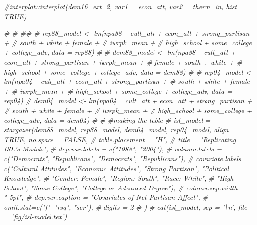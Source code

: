 \documentclass[
]{article}
\newenvironment{Shaded}{\begin{snugshade}}{\end{snugshade}}
\newcommand{\CommentTok}[1]{\textcolor[rgb]{0.56,0.35,0.01}{\textit{#1}}}
\begin{document}
\begin{Shaded}
\begin{Highlighting}[]
\CommentTok{#interplot::interplot(dem16_ext_2, var1 = econ_att, var2 = therm_in, hist = TRUE)}

\CommentTok{# }
\CommentTok{# ##}
\CommentTok{# rep88_model <- lm(npa88 ~ cult_att + econ_att + strong_partisan +}
\CommentTok{#                                       south + white + female +}
\CommentTok{#                                       iwrpk_mean +}
\CommentTok{#                                       high_school + some_college + college_adv, data = rep88)}
\CommentTok{# }
\CommentTok{# dem88_model <- lm(npa88 ~ cult_att + econ_att + strong_partisan + iwrpk_mean +}
\CommentTok{#                                       female + south + white +}
\CommentTok{#                                       high_school + some_college + college_adv, data = dem88)}
\CommentTok{# }
\CommentTok{# rep04_model <- lm(npa04 ~ cult_att + econ_att + strong_partisan +}
\CommentTok{#                                       south + white +  female +}
\CommentTok{#                                       iwrpk_mean +}
\CommentTok{#                                       high_school + some_college + college_adv, data = rep04)}
\CommentTok{# dem04_model <- lm(npa04 ~ cult_att + econ_att + strong_partisan +}
\CommentTok{#                                       south + white + female +}
\CommentTok{#                                       iwrpk_mean +}
\CommentTok{#                                       high_school + some_college + college_adv, data = dem04)}
\CommentTok{# }
\CommentTok{# #making the table}
\CommentTok{# isl_model = stargazer(dem88_model, rep88_model, dem04_model, rep04_model, align = TRUE, no.space = FALSE,}
\CommentTok{#                                           table.placement = "H",}
\CommentTok{#                                           title = "Replicating ISL's Models",}
\CommentTok{#                                           dep.var.labels = c("1988", "2004"),}
\CommentTok{#                                           column.labels = c("Democrats", "Republicans", "Democrats", "Republicans"),}
\CommentTok{#                                           covariate.labels = c("Cultural Attitudes", "Economic Attitudes", "Strong Partisan", "Political Knowledge",}
\CommentTok{#                                                                                    "Gender: Female", "Region: South", "Race: White",}
\CommentTok{#                                                                                    "High School", "Some College", "College or Advanced Degree"),}
\CommentTok{#                                           column.sep.width = "-5pt",}
\CommentTok{#                                           dep.var.caption = "Covariates of Net Partisan Affect",}
\CommentTok{#                                           omit.stat=c("f", "rsq", "ser"),}
\CommentTok{#                                           digits = 2}
\CommentTok{#                                           )}
\CommentTok{# cat(isl_model, sep = '\textbackslash{}n', file = 'fig/isl-model.tex')}
\end{Highlighting}
\end{Shaded}
\end{document}
